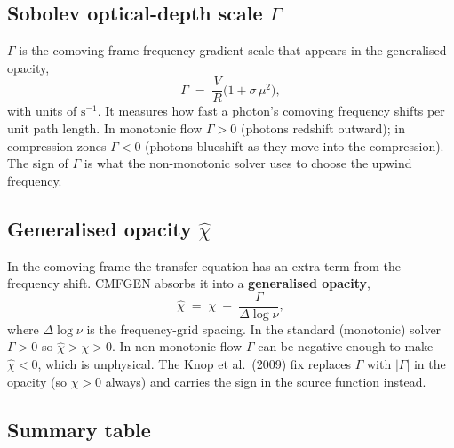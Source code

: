 \documentclass[11pt]{article}
\begin{document}
\subsection{Sobolev optical-depth scale \texorpdfstring{$\Gamma$}{Gamma}}

$\Gamma$ is the comoving-frame frequency-gradient scale that appears in
the generalised opacity,
\begin{equation}
  \Gamma \;=\; \frac{V}{R}\bigl(1 + \sigma\,\mu^{2}\bigr) ,
\end{equation}
with units of $\mathrm{s^{-1}}$.  It measures how fast a photon's
comoving frequency shifts per unit path length.  In monotonic flow
$\Gamma > 0$ (photons redshift outward); in compression zones
$\Gamma < 0$ (photons blueshift as they move into the compression).  The
sign of $\Gamma$ is what the non-monotonic solver uses to choose the
upwind frequency.

\subsection{Generalised opacity \texorpdfstring{$\hat\chi$}{hat-chi}}

In the comoving frame the transfer equation has an extra term from the
frequency shift.  CMFGEN absorbs it into a \textbf{generalised opacity},
\begin{equation}
  \hat\chi \;=\; \chi \;+\; \frac{\Gamma}{\Delta\log\nu} ,
\end{equation}
where $\Delta\log\nu$ is the frequency-grid spacing.  In the standard
(monotonic) solver $\Gamma > 0$ so $\hat\chi > \chi > 0$.  In
non-monotonic flow $\Gamma$ can be negative enough to make
$\hat\chi < 0$, which is unphysical.  The Knop et al.\ (2009) fix
replaces $\Gamma$ with $|\Gamma|$ in the opacity (so $\hat\chi > 0$
always) and carries the sign in the source function instead.

\subsection{Summary table}
\end{document}
